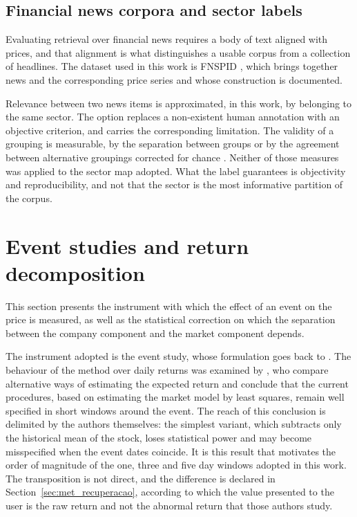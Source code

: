 \subsection{Financial news corpora and sector labels}

Evaluating retrieval over financial news requires a body of text aligned with prices, and that
alignment is what distinguishes a usable corpus from a collection of headlines. The dataset used in
this work is \gls{FNSPID} \autocite{dong2024fnspid}, which brings together news and the
corresponding price series and whose construction is documented.

Relevance between two news items is approximated, in this work, by belonging to the same sector.
The option replaces a non-existent human annotation with an objective criterion, and carries the
corresponding limitation. The validity of a grouping is measurable, by the separation between
groups \autocite{rousseeuw1987silhouettes} or by the agreement between alternative groupings
corrected for chance \autocite{vinh2010ami}. Neither of those measures was applied to the sector
map adopted. What the label guarantees is objectivity and reproducibility, and not that the sector
is the most informative partition of the corpus.

\section{Event studies and return decomposition}
\label{sec:ctx_evento}

This section presents the instrument with which the effect of an event on the price is measured, as
well as the statistical correction on which the separation between the company component and the
market component depends.

The instrument adopted is the event study, whose formulation goes back to
\textcite{fama1969adjustment}. The behaviour of the method over daily returns was examined by
\textcite{brown1985daily}, who compare alternative ways of estimating the expected return and
conclude that the current procedures, based on estimating the market model by least squares, remain
well specified in short windows around the event. The reach of this conclusion is delimited by the
authors themselves: the simplest variant, which subtracts only the historical mean of the stock,
loses statistical power and may become misspecified when the event dates coincide. It is this
result that motivates the order of magnitude of the one, three and five day windows adopted in this
work. The transposition is not direct, and the difference is declared in
Section~\ref{sec:met_recuperacao}, according to which the value presented to the user is the raw
return and not the abnormal return that those authors study.


